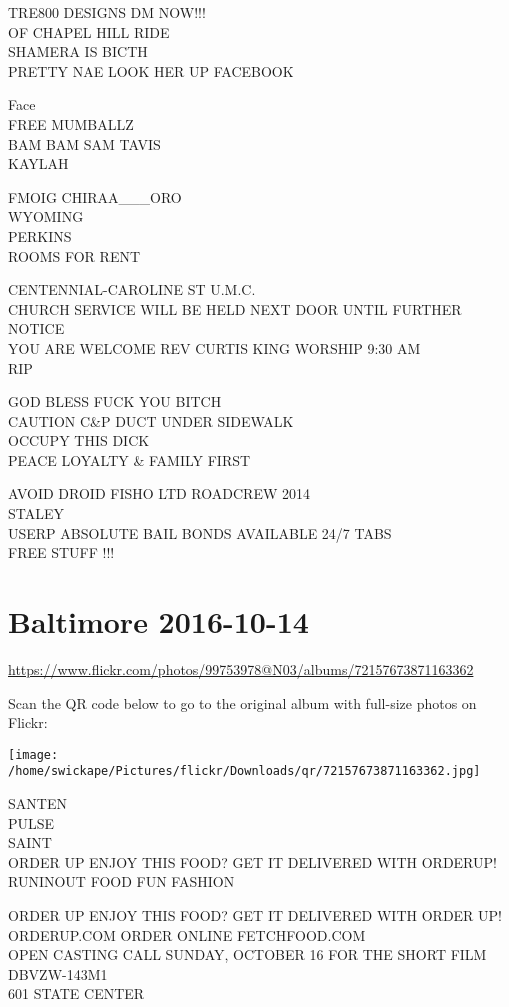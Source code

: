 \documentclass[10pt,letterpaper]{article}
\begin{document}
TRE800 DESIGNS DM NOW!!!\\
OF CHAPEL HILL RIDE\\
SHAMERA IS BICTH\\
PRETTY NAE LOOK HER UP FACEBOOK

Face\\
FREE MUMBALLZ\\
BAM BAM SAM TAVIS\\
KAYLAH

FMOIG CHIRAA\_\_\_ORO\\
WYOMING\\
PERKINS\\
ROOMS FOR RENT

CENTENNIAL{-}CAROLINE ST U.M.C.\\
CHURCH SERVICE WILL BE HELD NEXT DOOR UNTIL FURTHER NOTICE\\
YOU ARE WELCOME REV CURTIS KING WORSHIP 9:30 AM\\
RIP

GOD BLESS FUCK YOU BITCH\\
CAUTION C\&P DUCT UNDER SIDEWALK\\
OCCUPY THIS DICK\\
PEACE LOYALTY \& FAMILY FIRST

AVOID DROID FISHO LTD ROADCREW 2014\\
STALEY\\
USERP ABSOLUTE BAIL BONDS AVAILABLE 24/7 TABS\\
FREE STUFF !!!


\section*{Baltimore 2016-10-14}

\url{https://www.flickr.com/photos/99753978@N03/albums/72157673871163362}

Scan the QR code below to go to the original album with full-size photos on Flickr:

\texttt{[image: /home/swickape/Pictures/flickr/Downloads/qr/72157673871163362.jpg]}


SANTEN\\
PULSE\\
SAINT\\
ORDER UP ENJOY THIS FOOD?  GET IT DELIVERED WITH ORDERUP!  RUNINOUT FOOD FUN FASHION

ORDER UP ENJOY THIS FOOD?  GET IT DELIVERED WITH ORDER UP!  ORDERUP.COM  ORDER ONLINE FETCHFOOD.COM\\
OPEN CASTING CALL SUNDAY, OCTOBER 16 FOR THE SHORT FILM\\
DBVZW{-}143M1\\
601 STATE CENTER
\end{document}
